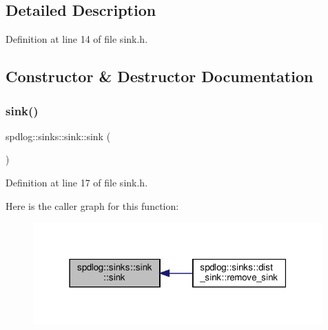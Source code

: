 \subsection{Detailed Description}


Definition at line 14 of file sink.\+h.



\subsection{Constructor \& Destructor Documentation}
\mbox{\label{classspdlog_1_1sinks_1_1sink_a9fc419b02a5b7bd279da42f04f6979ab}} 
\subsubsection{\texorpdfstring{sink()}{sink()}\hspace{0.1cm}{\footnotesize\ttfamily [1/2]}}
{\footnotesize\ttfamily spdlog\+::sinks\+::sink\+::sink (\begin{DoxyParamCaption}{ }\end{DoxyParamCaption})\hspace{0.3cm}{\ttfamily [inline]}}



Definition at line 17 of file sink.\+h.

Here is the caller graph for this function\+:
\nopagebreak
\begin{figure}[H]
\begin{center}
\leavevmode
\includegraphics[width=315pt]{classspdlog_1_1sinks_1_1sink_a9fc419b02a5b7bd279da42f04f6979ab_icgraph}
\end{center}
\end{figure}
\mbox{\label{classspdlog_1_1sinks_1_1sink_a8523cd526092feffd549cf7a8b5f38fe}} 
